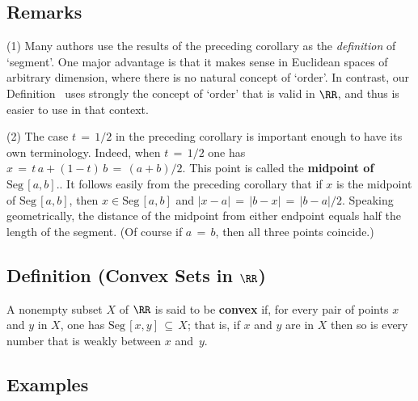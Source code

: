 \VV

           \subsection{\small{\bf Remarks}}
            \label{RemrkB20.150B}
\V

\hspace*{\parindent}(1) Many authors use the results of the preceding corollary as the {\em definition} of `segment'.
    One major advantage is that it makes sense in Euclidean spaces of arbitrary dimension, where there is no natural concept of `order'.
    In contrast, our Definition~ uses strongly the concept of `order' that is valid in ${\RR}$, and thus is easier to use in that context.

\V


        (2) The case $t \,=\, 1/2$ in the preceding corollary is important enough to have its own terminology.
    Indeed, when $t \,=\, 1/2$ one has $x \,=\, t\,a + (1-t)\,b \,=\, (a+b)/2$. This point is called the
    {\bf midpoint of $\mbox{Seg}\,[a,b]$}..
    It follows easily from the preceding corollary that if $x$ is the midpoint of $\mbox{Seg}\,[a,b]$,
    then $x{\in}\mbox{Seg}\,[a,b]$ and $|x-a| \,=\, |b-x| \,=\, |b-a|/2$. Speaking geometrically,
    the distance of the midpoint from either endpoint equals half the length of the segment. (Of course if $a \,=\, b$, then all three points coincide.)

\V


            \subsection{\small{\bf Definition} (Convex Sets in ${\RR}$)}
            \label{DefB20.155A}
\V

        A nonempty subset $X$ of ${\RR}$ is said to be {\bf convex} if, for every pair of points $x$ and $y$ in $X$,
    one has $\mbox{Seg}\,[x,y] \,{\subseteq}\, X$; that is, if $x$ and $y$ are in $X$ then so is every number that is weakly between $x$ and~$y$.

\V



            \subsection{\small{\bf Examples}}
            \label{ExampB20.155B}

